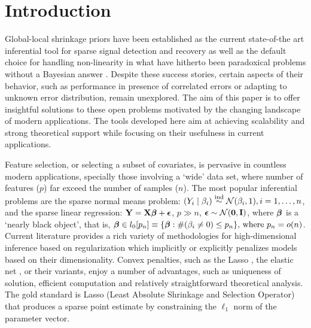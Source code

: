 \documentclass[ba]{imsart}
\begin{document}
\section{Introduction}

Global-local shrinkage priors have been established as the current state-of-the art inferential tool for sparse signal detection and recovery as well as the default choice for handling non-linearity in what have hitherto been paradoxical problems without a Bayesian answer \citep{polson2010shrink, van2017adaptive, bhadra2017horseshoe}. Despite these success stories, certain aspects of their behavior, such as performance in presence of correlated errors or adapting to unknown error distribution, remain unexplored. The aim of this paper is to offer insightful solutions to these open problems motivated by the changing landscape of modern applications. The tools developed here aim at achieving scalability and strong theoretical support while focusing on their usefulness in current applications. 

Feature selection, or selecting a subset of covariates, is pervasive in countless modern applications, specially those involving a `wide' data set, where number of features ($p$) far exceed the number of samples ($n$). The most popular inferential problems are the sparse normal means problem: $(Y_i \mid \beta_i)  \stackrel{\mathrm{ind}}{\sim} \mathcal{N} (\beta_i,1), i = 1, \dots, n$, and the sparse linear regression: ${\bf Y} = {\bf X} \boldsymbol{\beta} + \boldsymbol{\epsilon}$, $p \gg n$, $\boldsymbol{\epsilon} \sim \mathcal{N}({\bf 0}, {\bf I})$, where $\boldsymbol{\beta}$ is a `nearly black object', that is, $\boldsymbol{\beta} \in l_0 [ p_n] \equiv \{ \boldsymbol{\beta} : \# ( \beta_i \neq 0 ) \leq p_n \}, \, \text{where } p_n = o(n) $. Current literature provides a rich variety of methodologies for high-dimensional inference based on regularization which implicitly or explicitly penalizes models based on their dimensionality. Convex penalties, such as the Lasso \citep{tibshirani96}, the elastic net \citep{zou2005regularization}, or their variants, enjoy a number of advantages, such as uniqueness of solution, efficient computation and relatively straightforward theoretical analysis. The gold standard is Lasso (Least Absolute Shrinkage and Selection Operator) that produces a sparse point estimate by constraining the $\ell_1$ norm of the parameter vector.  
\end{document}

